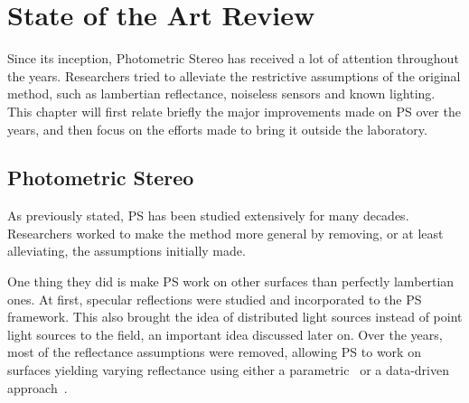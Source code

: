 \documentclass{report}
\begin{document}
\chapter{State of the Art Review}
\label{c:sota}


Since its inception, Photometric Stereo has received a lot of attention throughout the years. Researchers tried to alleviate the restrictive assumptions of the original method, such as lambertian reflectance, noiseless sensors and known lighting. This chapter will first relate briefly the major improvements made on PS over the years, and then focus on the efforts made to bring it outside the laboratory.


\section{Photometric Stereo}

As previously stated, PS has been studied extensively for many decades. Researchers worked to make the method more general by removing, or at least alleviating, the assumptions initially made.

One thing they did is make PS work on other surfaces than perfectly lambertian ones. At first, specular reflections \cite{Ikeuchi1981} were studied and incorporated to the PS framework. This also brought the idea of distributed light sources instead of point light sources to the field, an important idea discussed later on. Over the years, most of the reflectance assumptions were removed, allowing PS to work on surfaces yielding varying reflectance using either a parametric~\cite{hertzmann-pami-05,goldman-tpami-10} or a data-driven approach~\cite{alldrin-cvpr-08}.
\end{document}

